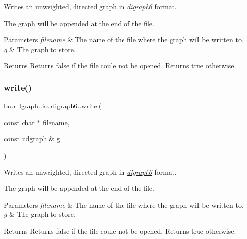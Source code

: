Writes an unweighted, directed graph in {\itshape \hyperlink{namespacelgraph_1_1io_1_1digraph6}{digraph6}} format. 

The graph will be appended at the end of the file. 
\begin{DoxyParams}{Parameters}
{\em filename} & The name of the file where the graph will be written to. \\
\hline
{\em g} & The graph to store. \\
\hline
\end{DoxyParams}
\begin{DoxyReturn}{Returns}
Returns false if the file coule not be opened. Returns true otherwise. 
\end{DoxyReturn}
\mbox{\label{namespacelgraph_1_1io_1_1digraph6_a9cf136a86f4da536fd2a18d0a135bdec}} 
\subsubsection{\texorpdfstring{write()}{write()}\hspace{0.1cm}{\footnotesize\ttfamily [2/2]}}
{\footnotesize\ttfamily bool lgraph\+::io\+::digraph6\+::write (\begin{DoxyParamCaption}\item[{const char $\ast$}]{filename,  }\item[{const \hyperlink{classlgraph_1_1udgraph}{udgraph} \&}]{g }\end{DoxyParamCaption})}



Writes an unweighted, directed graph in {\itshape \hyperlink{namespacelgraph_1_1io_1_1digraph6}{digraph6}} format. 

The graph will be appended at the end of the file. 
\begin{DoxyParams}{Parameters}
{\em filename} & The name of the file where the graph will be written to. \\
\hline
{\em g} & The graph to store. \\
\hline
\end{DoxyParams}
\begin{DoxyReturn}{Returns}
Returns false if the file coule not be opened. Returns true otherwise. 
\end{DoxyReturn}
